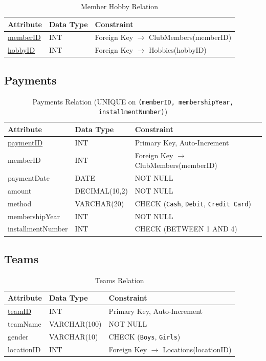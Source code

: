 \documentclass[11pt,a4paper]{article}
\begin{document}
\begin{table}[H]
\centering
\begin{tabular}{lll}
\toprule
Attribute & Data Type & Constraint \\
\midrule
\underline{memberID} & INT & Foreign Key $\rightarrow$ ClubMembers(memberID) \\
\underline{hobbyID} & INT & Foreign Key $\rightarrow$ Hobbies(hobbyID) \\
\bottomrule
\end{tabular}
\caption{Member Hobby Relation}
\end{table}


\subsection{Payments}

\begin{table}[H]
\centering
\begin{tabular}{lll}
\toprule
Attribute & Data Type & Constraint \\
\midrule
\underline{paymentID} & INT & Primary Key, Auto-Increment \\
memberID & INT & Foreign Key $\rightarrow$ ClubMembers(memberID) \\
paymentDate & DATE & NOT NULL \\
amount & DECIMAL(10,2) & NOT NULL \\
method & VARCHAR(20) & CHECK (\texttt{Cash}, \texttt{Debit}, \texttt{Credit Card}) \\
membershipYear & INT & NOT NULL \\
installmentNumber & INT & CHECK (BETWEEN 1 AND 4) \\
\bottomrule
\end{tabular}
\caption{Payments Relation (UNIQUE on \texttt{(memberID, membershipYear, installmentNumber)})}
\end{table}


\subsection{Teams}

\begin{table}[H]
\centering
\begin{tabular}{lll}
\toprule
Attribute & Data Type & Constraint \\
\midrule
\underline{teamID} & INT & Primary Key, Auto-Increment \\
teamName & VARCHAR(100) & NOT NULL \\
gender & VARCHAR(10) & CHECK (\texttt{Boys}, \texttt{Girls}) \\
locationID & INT & Foreign Key $\rightarrow$ Locations(locationID) \\
\bottomrule
\end{tabular}
\caption{Teams Relation}
\end{table}
\end{document}
